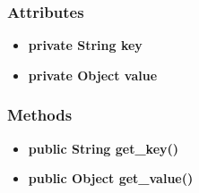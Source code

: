 \subsubsection{Attributes}
\begin{itemize}
	\item \textbf{private String key}
	\item \textbf{private Object value}
\end{itemize}
\subsubsection{Methods}
\begin{itemize}
	\item \textbf{public String get\_key()}
	\item \textbf{public Object get\_value()}
\end{itemize}